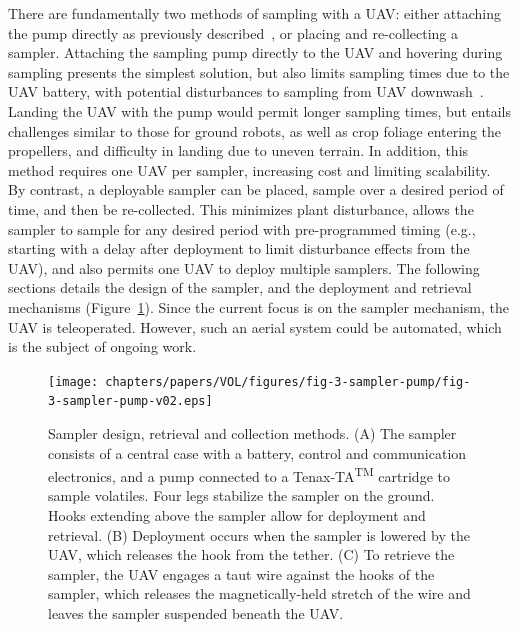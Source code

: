 There are fundamentally two methods of sampling with a UAV: either attaching the pump directly as previously described~\cite{mckinney_sampler_2019}, or placing and re-collecting a sampler. Attaching the sampling pump directly to the UAV and hovering during sampling presents the simplest solution, but also limits sampling times due to the UAV battery, with potential disturbances to sampling from UAV downwash~\cite{mckinney_sampler_2019}. Landing the UAV with the pump would permit longer sampling times, but entails challenges similar to those for ground robots, as well as crop foliage entering the propellers, and difficulty in landing due to uneven terrain. In addition, this method requires one UAV per sampler, increasing cost and limiting scalability.
By contrast, a deployable sampler can be placed, sample over a desired period of time, and then be re-collected. This minimizes plant disturbance, allows the sampler to sample for any desired period with pre-programmed timing (e.g., starting with a delay after deployment to limit disturbance effects from the UAV), and also permits one UAV to deploy multiple samplers. The following sections details the design of the sampler, and the deployment and retrieval mechanisms (Figure~\ref{fig-3-pump-collection}). Since the current focus is on the sampler mechanism, the UAV is teleoperated. However, such an aerial system could be automated, which is the subject of ongoing work.

\begin{figure}[h!t]
\centering
\texttt{[image: chapters/papers/VOL/figures/fig-3-sampler-pump/fig-3-sampler-pump-v02.eps]}
\caption{Sampler design, retrieval and collection methods. (A) The sampler consists of a central case with a battery, control and communication electronics, and a pump connected to a Tenax-TA\textsuperscript{TM} cartridge to sample volatiles. Four legs stabilize the sampler on the ground. Hooks extending above the sampler allow for deployment and retrieval. (B) Deployment occurs when the sampler is lowered by the UAV, which releases the hook from the tether. (C) To retrieve the sampler, the UAV engages a taut wire against the hooks of the sampler, which releases the magnetically-held stretch of the wire and leaves the sampler suspended beneath the UAV. }
\label{fig-3-pump-collection}
\end{figure}

